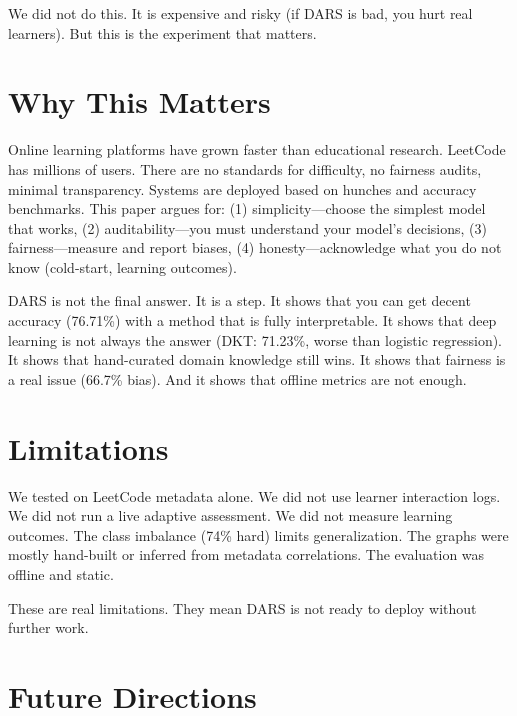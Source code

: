 \documentclass[conference]{IEEEtran}
\begin{document}
We did not do this. It is expensive and risky (if DARS is bad, you hurt real learners). But this is the experiment that matters.

\section{Why This Matters}

Online learning platforms have grown faster than educational research. LeetCode has millions of users. There are no standards for difficulty, no fairness audits, minimal transparency. Systems are deployed based on hunches and accuracy benchmarks. This paper argues for: (1) simplicity—choose the simplest model that works, (2) auditability—you must understand your model's decisions, (3) fairness—measure and report biases, (4) honesty—acknowledge what you do not know (cold-start, learning outcomes).

DARS is not the final answer. It is a step. It shows that you can get decent accuracy (76.71\%) with a method that is fully interpretable. It shows that deep learning is not always the answer (DKT: 71.23\%, worse than logistic regression). It shows that hand-curated domain knowledge still wins. It shows that fairness is a real issue (66.7\% bias). And it shows that offline metrics are not enough.

\section{Limitations}

We tested on LeetCode metadata alone. We did not use learner interaction logs. We did not run a live adaptive assessment. We did not measure learning outcomes. The class imbalance (74\% hard) limits generalization. The graphs were mostly hand-built or inferred from metadata correlations. The evaluation was offline and static.

These are real limitations. They mean DARS is not ready to deploy without further work.

\section{Future Directions}
\end{document}

